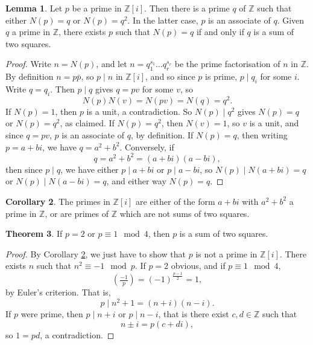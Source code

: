 \documentclass{article}
\newcommand{\Z}{\mathbb{Z}}
\newcommand{\rb}[1]{\left( #1 \right)}
\renewcommand{\sb}[1]{\left[ #1 \right]}
\newcommand{\legendre}[2]{\rb{\tfrac{#1}{#2}}}
\theoremstyle{definition}\newtheorem{definition}{Definition}
\theoremstyle{definition}\newtheorem{remark}[definition]{Remark}
\theoremstyle{definition}\newtheorem*{example}{Example}
\theoremstyle{definition}\newtheorem*{note}{Note}
\newtheorem{lemma}[definition]{Lemma}
\newtheorem{theorem}[definition]{Theorem}
\newtheorem{corollary}[definition]{Corollary}
\begin{document}

\begin{lemma}
Let $ p $ be a prime in $ \Z\sb{i} $. Then there is a prime $ q $ of $ \Z $ such that either $ N\rb{p} = q $ or $ N\rb{p} = q^2 $. In the latter case, $ p $ is an associate of $ q $. Given $ q $ a prime in $ \Z $, there exists $ p $ such that $ N\rb{p} = q $ if and only if $ q $ is a sum of two squares.
\end{lemma}

\begin{proof}
Write $ n = N\rb{p} $, and let $ n = q_1^{s_1} \dots q_r^{s_r} $ be the prime factorisation of $ n $ in $ \Z $. By definition $ n = p\bar{p} $, so $ p \mid n $ in $ \Z\sb{i} $, and so since $ p $ is prime, $ p \mid q_i $ for some $ i $. Write $ q = q_i $. Then $ p \mid q $ gives $ q = pv $ for some $ v $, so
$$ N\rb{p}N\rb{v} = N\rb{pv} = N\rb{q} = q^2. $$
If $ N\rb{p} = 1 $, then $ p $ is a unit, a contradiction. So $ N\rb{p} \mid q^2 $ gives $ N\rb{p} = q $ or $ N\rb{p} = q^2 $, as claimed. If $ N\rb{p} = q^2 $, then $ N\rb{v} = 1 $, so $ v $ is a unit, and since $ q = pv $, $ p $ is an associate of $ q $, by definition. If $ N\rb{p} = q $, then writing $ p = a + bi $, we have $ q = a^2 + b^2 $. Conversely, if
$$ q = a^2 + b^2 = \rb{a + bi}\rb{a - bi}, $$
then since $ p \mid q $, we have either $ p \mid a + bi $ or $ p \mid a - bi $, so $ N\rb{p} \mid N\rb{a + bi} = q $ or $ N\rb{p} \mid N\rb{a - bi} = q $, and either way $ N\rb{p} = q $.
\end{proof}

\begin{corollary}
\label{cor:50}
The primes in $ \Z\sb{i} $ are either of the form $ a + bi $ with $ a^2 + b^2 $ a prime in $ \Z $, or are primes of $ \Z $ which are not sums of two squares.
\end{corollary}

\begin{theorem}
If $ p = 2 $ or $ p \equiv 1 \mod 4 $, then $ p $ is a sum of two squares.
\end{theorem}

\begin{proof}
By Corollary \ref{cor:50}, we just have to show that $ p $ is not a prime in $ \Z\sb{i} $. There exists $ n $ such that $ n^2 \equiv -1 \mod p $. If $ p = 2 $ obvious, and if $ p \equiv 1 \mod 4 $,
$$ \legendre{-1}{p} = \rb{-1}^{\tfrac{p - 1}{2}} = 1, $$
by Euler's criterion. That is,
$$ p \mid n^2 + 1 = \rb{n + i}\rb{n - i}. $$
If $ p $ were prime, then $ p \mid n + i $ or $ p \mid n - i $, that is there exist $ c, d \in \Z $ such that
$$ n \pm i = p\rb{c + di}, $$
so $ 1 = pd $, a contradiction.
\end{proof}
\end{document}
